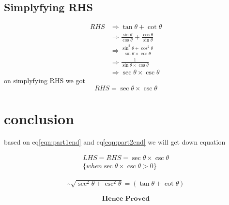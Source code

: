 \documentclass[12pt,twocolumn]{article}
\begin{document}
\subsection*{Simplyfying RHS}
 \begin{align}
  RHS&\Rightarrow \tan{\theta}+\cot{\theta}  \\
     &\Rightarrow  \frac{\sin{\theta}}{\cos{\theta}}+\frac{\cos{\theta}}{\sin{\theta}} \\
     &\Rightarrow \frac{\sin^2{\theta}+\cos^2{\theta}}{\sin{\theta}\times\cos{\theta}}\\
     &\Rightarrow \frac{1}{\sin{\theta}\times\cos{\theta}}\\
     &\Rightarrow \sec{\theta}\times\csc{\theta}
 \end{align}
on simplyfying RHS we got
\begin{equation}
\label{eqn:part2end}
RHS =  \sec{\theta}\times\csc{\theta}
\end{equation}

\section*{conclusion}
 based on eq\ref{eqn:part1end} and eq\ref{eqn:part2end} we will get down equation
 
 \begin{multline}
 LHS = RHS =   \sec{\theta}\times\csc{\theta} \\
        \{when \sec{\theta}\times\csc{\theta} >0 \}
 \end{multline}
 

\begin{align*}
\therefore\sqrt{\sec^2{\theta}+\csc^2{\theta}}=(\tan{\theta}+\cot{\theta})
\end{align*}


\[\textbf{Hence Proved}\]
\end{document}

